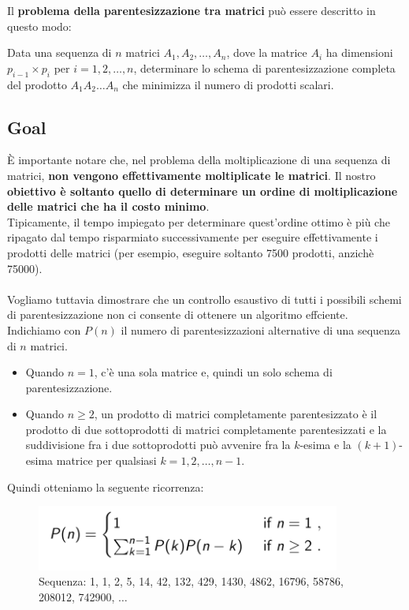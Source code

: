 Il \textbf{problema della parentesizzazione tra matrici} può essere
descritto in questo modo:
\begin{myblockquote}
  Data una sequenza di $n$
  matrici $A_1, A_2, \ldots, A_n$, dove la matrice $A_i$ ha dimensioni
  $p_{i-1} \times p_i$ per $i = 1,2, \ldots,n$, determinare lo schema di
  parentesizzazione completa del prodotto $A_1A_2 \ldots A_n$ che minimizza
  il numero di prodotti scalari.
\end{myblockquote}


\subsection{Goal}

È importante notare che, nel problema della moltiplicazione di una
sequenza di matrici, \textbf{non vengono effettivamente moltiplicate le
  matrici}. Il nostro \textbf{obiettivo è soltanto quello di determinare
  un ordine di moltiplicazione delle matrici che ha il costo minimo}.\\
Tipicamente, il tempo impiegato per determinare quest'ordine ottimo è
più che ripagato dal tempo risparmiato successivamente per eseguire
effettivamente i prodotti delle matrici (per esempio, eseguire soltanto
7500 prodotti, anzichè 75000).\\
\\
Vogliamo tuttavia dimostrare che un controllo esaustivo di tutti i
possibili schemi di parentesizzazione non ci consente di ottenere un
algoritmo effciente. Indichiamo con $P(n)$ il numero di
parentesizzazioni alternative di una sequenza di $n$ matrici.
\begin{itemize}
  \item Quando
        $n=1$, c'è una sola matrice e, quindi un solo schema di
        parentesizzazione.
  \item Quando $n \ge 2$, un prodotto di matrici
        completamente parentesizzato è il prodotto di due sottoprodotti di
        matrici completamente parentesizzati e la suddivisione fra i due
        sottoprodotti può avvenire fra la $k$-esima e la $(k+1)$-esima matrice per
        qualsiasi $k=1,2,\ldots,n-1$.
\end{itemize}

Quindi otteniamo la seguente ricorrenza:

\begin{figure}[H]
  \centering
  \includegraphics[width=10cm, keepaspectratio]{capitoli/programmazione_dinamica/imgs/matrix1.png}
  \caption{Sequenza: 1, 1, 2, 5, 14, 42, 132, 429, 1430, 4862, 16796, 58786, 208012, 742900,
    $\ldots$}
\end{figure}


